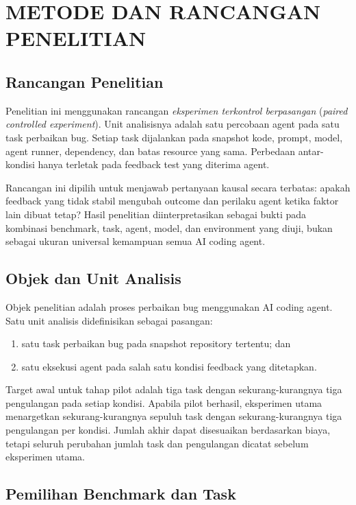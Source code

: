 \chapter{METODE DAN RANCANGAN PENELITIAN}

\section{Rancangan Penelitian}

Penelitian ini menggunakan rancangan \textit{eksperimen terkontrol berpasangan} (\textit{paired controlled experiment}). Unit analisisnya adalah satu percobaan agent pada satu task perbaikan bug. Setiap task dijalankan pada snapshot kode, prompt, model, agent runner, dependency, dan batas resource yang sama. Perbedaan antar-kondisi hanya terletak pada feedback test yang diterima agent.

Rancangan ini dipilih untuk menjawab pertanyaan kausal secara terbatas: apakah feedback yang tidak stabil mengubah outcome dan perilaku agent ketika faktor lain dibuat tetap? Hasil penelitian diinterpretasikan sebagai bukti pada kombinasi benchmark, task, agent, model, dan environment yang diuji, bukan sebagai ukuran universal kemampuan semua AI coding agent.

\section{Objek dan Unit Analisis}

Objek penelitian adalah proses perbaikan bug menggunakan AI coding agent. Satu unit analisis didefinisikan sebagai pasangan:

\begin{enumerate}[leftmargin=*]
    \item satu task perbaikan bug pada snapshot repository tertentu; dan
    \item satu eksekusi agent pada salah satu kondisi feedback yang ditetapkan.
\end{enumerate}

Target awal untuk tahap pilot adalah tiga task dengan sekurang-kurangnya tiga pengulangan pada setiap kondisi. Apabila pilot berhasil, eksperimen utama menargetkan sekurang-kurangnya sepuluh task dengan sekurang-kurangnya tiga pengulangan per kondisi. Jumlah akhir dapat disesuaikan berdasarkan biaya, tetapi seluruh perubahan jumlah task dan pengulangan dicatat sebelum eksperimen utama.

\section{Pemilihan Benchmark dan Task}

